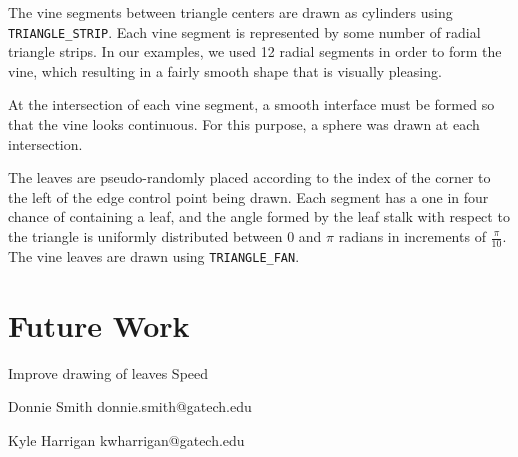 \documentclass[letterpaper,10pt]{IEEEtran}
\begin{document}
The vine segments between triangle centers are drawn as cylinders using  \verb+TRIANGLE_STRIP+.
Each vine segment is represented by some number of radial triangle strips.
In our examples, we used 12 radial segments in order to form the vine, which resulting in a fairly smooth shape that is visually pleasing.

At the intersection of each vine segment, a smooth interface must be formed so that the vine looks continuous.
For this purpose, a sphere was drawn at each intersection.

The leaves are pseudo-randomly placed according to the index of the corner to the left of the edge control point being drawn.
Each segment has a one in four chance of containing a leaf, and the angle formed by the leaf stalk with respect to the triangle is uniformly distributed between 0 and $\pi$ radians in increments of $\frac{\pi}{10}$.
The vine leaves are drawn using \verb+TRIANGLE_FAN+.

\section{Future Work}

Improve drawing of leaves
Speed


\begin{IEEEbiography}{Donnie Smith} donnie.smith@gatech.edu
\end{IEEEbiography}

\begin{IEEEbiography}{Kyle Harrigan} kwharrigan@gatech.edu
\end{IEEEbiography}
\end{document}
